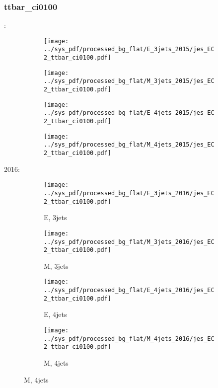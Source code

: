 \documentclass{beamer}
\begin{document}
\begin{frame}
\frametitle{ttbar_ci0100}
\fontsize{5}{1}:
\begin{figure}
\centering
\begin{subfigure}[b]{0.24\textwidth}
\texttt{[image: ../sys\_pdf/processed\_bg\_flat/E\_3jets\_2015/jes\_EC2\_ttbar\_ci0100.pdf]}
\end{subfigure}
\begin{subfigure}[b]{0.24\textwidth}
\texttt{[image: ../sys\_pdf/processed\_bg\_flat/M\_3jets\_2015/jes\_EC2\_ttbar\_ci0100.pdf]}
\end{subfigure}
\begin{subfigure}[b]{0.24\textwidth}
\texttt{[image: ../sys\_pdf/processed\_bg\_flat/E\_4jets\_2015/jes\_EC2\_ttbar\_ci0100.pdf]}
\end{subfigure}
\begin{subfigure}[b]{0.24\textwidth}
\texttt{[image: ../sys\_pdf/processed\_bg\_flat/M\_4jets\_2015/jes\_EC2\_ttbar\_ci0100.pdf]}
\end{subfigure}
\end{figure}
2016:
\begin{figure}
\centering
\begin{subfigure}[b]{0.24\textwidth}
\texttt{[image: ../sys\_pdf/processed\_bg\_flat/E\_3jets\_2016/jes\_EC2\_ttbar\_ci0100.pdf]}
\captionsetup{font=tiny}
\caption{E, 3jets}
\end{subfigure}
\begin{subfigure}[b]{0.24\textwidth}
\texttt{[image: ../sys\_pdf/processed\_bg\_flat/M\_3jets\_2016/jes\_EC2\_ttbar\_ci0100.pdf]}
\captionsetup{font=tiny}
\caption{M, 3jets}
\end{subfigure}
\begin{subfigure}[b]{0.24\textwidth}
\texttt{[image: ../sys\_pdf/processed\_bg\_flat/E\_4jets\_2016/jes\_EC2\_ttbar\_ci0100.pdf]}
\captionsetup{font=tiny}
\caption{E, 4jets}
\end{subfigure}
\begin{subfigure}[b]{0.24\textwidth}
\texttt{[image: ../sys\_pdf/processed\_bg\_flat/M\_4jets\_2016/jes\_EC2\_ttbar\_ci0100.pdf]}
\captionsetup{font=tiny}
\caption{M, 4jets}
\end{subfigure}
\end{figure}
\end{frame}
\end{document}
